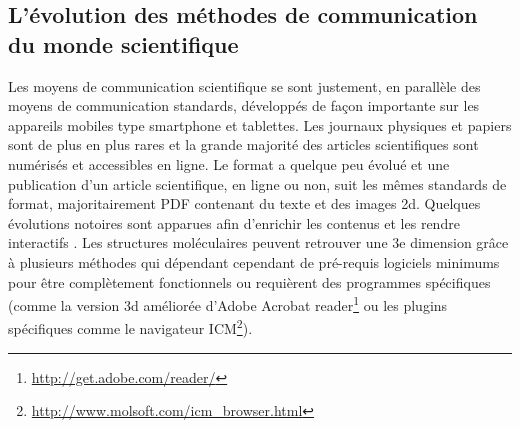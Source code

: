 \subsection{L'évolution des méthodes de communication du monde scientifique}

Les moyens de communication scientifique se sont justement, en parallèle des moyens de communication standards, développés de façon importante sur les appareils mobiles type smartphone et tablettes. Les journaux physiques et papiers sont de plus en plus rares et la grande majorité des articles scientifiques sont numérisés et accessibles en ligne. Le format a quelque peu évolué et une publication d'un article scientifique, en ligne ou non, suit les mêmes standards de format, majoritairement PDF contenant du texte et des images 2d. Quelques évolutions notoires sont apparues afin d'enrichir les contenus et les rendre interactifs \cite{attwood2010utopia}. Les structures moléculaires peuvent retrouver une 3e dimension grâce à plusieurs méthodes \cite{kumar2008grasping,raush2009new} qui dépendant cependant de pré-requis logiciels minimums pour être complètement fonctionnels ou requièrent des programmes spécifiques (comme la version 3d améliorée d'Adobe Acrobat reader\footnote{\url{http://get.adobe.com/reader/}} ou les plugins spécifiques comme le navigateur ICM\footnote{\url{http://www.molsoft.com/icm_browser.html}}).

